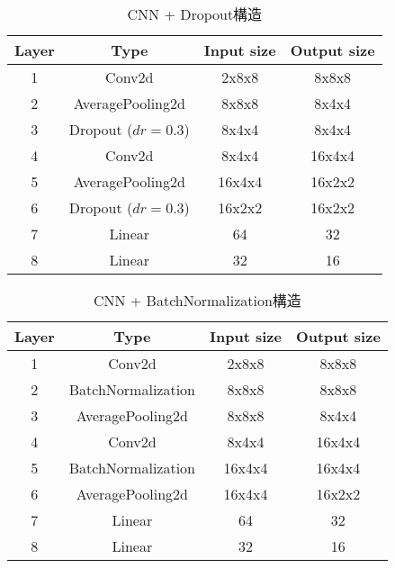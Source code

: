 \begin{table}[htb]
    \centering
    \caption{CNN + Dropout構造}
    \label{tab:model:parameter:cnn:dropout}
    \begin{tabular}{cccc}
        \hline
        \textbf{Layer}& \textbf{Type}&\textbf{Input size} & \textbf{Output size}\\
        \hline
        1   & Conv2d & 2x8x8 & 8x8x8 \\
        2 & AveragePooling2d & 8x8x8 & 8x4x4 \\
        3 & Dropout ($dr=0.3$) & 8x4x4 & 8x4x4 \\
        4 & Conv2d & 8x4x4 & 16x4x4 \\
        5 & AveragePooling2d & 16x4x4 & 16x2x2 \\
        6 & Dropout ($dr=0.3$) & 16x2x2 & 16x2x2 \\
        7 & Linear & 64 & 32 \\
        8 & Linear & 32 & 16 \\
        \hline
    \end{tabular}
\end{table}

\begin{table}[htb]
    \centering
    \caption{CNN + BatchNormalization構造}
    \label{tab:model:parameter:cnn:batchnormalization}
    \begin{tabular}{cccc}
        \hline
        \textbf{Layer}& \textbf{Type}&\textbf{Input size} & \textbf{Output size}\\
        \hline
        1   & Conv2d & 2x8x8 & 8x8x8 \\
        2 & BatchNormalization & 8x8x8 & 8x8x8 \\
        3 & AveragePooling2d & 8x8x8 & 8x4x4 \\
        4 & Conv2d & 8x4x4 & 16x4x4 \\
        5 & BatchNormalization & 16x4x4 & 16x4x4 \\
        6 & AveragePooling2d & 16x4x4 & 16x2x2 \\
        7 & Linear & 64 & 32 \\
        8 & Linear & 32 & 16 \\
        \hline
    \end{tabular}
\end{table}



